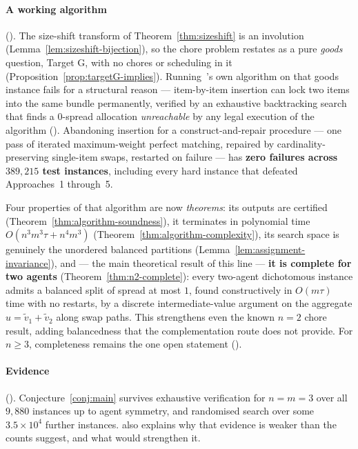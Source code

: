 \paragraph{A working algorithm} ().
The size-shift transform of Theorem~\ref{thm:sizeshift} is an involution
(Lemma~\ref{lem:sizeshift-bijection}), so the chore problem restates as a pure
\emph{goods} question, Target G, with no chores or scheduling in it
(Proposition~\ref{prop:targetG-implies}). Running~\cite{BKNS22}'s own algorithm
on that goods instance fails for a structural reason --- item-by-item insertion
can lock two items into the same bundle permanently, verified by an exhaustive
backtracking search that finds a $0$-spread allocation \emph{unreachable} by any
legal execution of the algorithm (). Abandoning
insertion for a construct-and-repair procedure --- one pass of iterated
maximum-weight perfect matching, repaired by cardinality-preserving single-item
swaps, restarted on failure --- has \textbf{zero failures across $389{,}215$
test instances}, including every hard instance that defeated
Approaches~1 through~5.

Four properties of that algorithm are now \emph{theorems}: its outputs are
certified (Theorem~\ref{thm:algorithm-soundness}), it terminates in polynomial
time $O(n^3 m^3 \tau + n^4 m^3)$ (Theorem~\ref{thm:algorithm-complexity}), its
search space is genuinely the unordered balanced partitions
(Lemma~\ref{lem:assignment-invariance}), and --- the main theoretical result of
this line --- \textbf{it is complete for two agents}
(Theorem~\ref{thm:n2-complete}): every two-agent dichotomous instance admits a
balanced split of spread at most $1$, found constructively in $O(m\tau)$ time
with no restarts, by a discrete intermediate-value argument on the aggregate
$u = \tilde{v}_1 + \tilde{v}_2$ along swap paths. This strengthens even the
known $n = 2$ chore result, adding balancedness that the complementation route
does not provide. For $n \ge 3$, completeness remains the one open statement
().

\paragraph{Evidence} ().
Conjecture~\ref{conj:main} survives exhaustive verification for $n = m = 3$ over
all $9{,}880$ instances up to agent symmetry, and randomised search over some
$3.5 \times 10^4$ further instances.  also explains why
that evidence is weaker than the counts suggest, and what would strengthen it.
